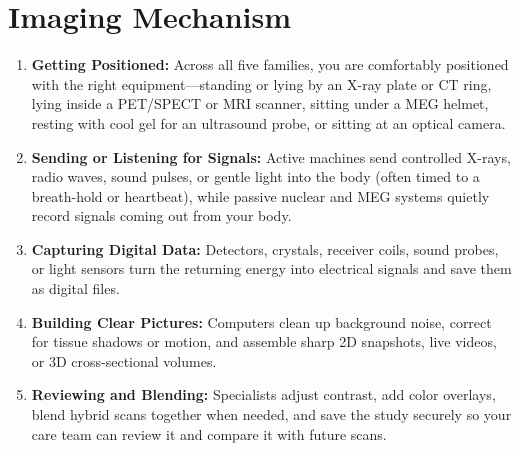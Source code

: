 \section{Imaging Mechanism}
\begin{enumerate}
  \item \textbf{Getting Positioned:} Across all five families, you are comfortably positioned with the right equipment---standing or lying by an X-ray plate or CT ring, lying inside a PET/SPECT or MRI scanner, sitting under a MEG helmet, resting with cool gel for an ultrasound probe, or sitting at an optical camera.
  \item \textbf{Sending or Listening for Signals:} Active machines send controlled X-rays, radio waves, sound pulses, or gentle light into the body (often timed to a breath-hold or heartbeat), while passive nuclear and MEG systems quietly record signals coming out from your body.
  \item \textbf{Capturing Digital Data:} Detectors, crystals, receiver coils, sound probes, or light sensors turn the returning energy into electrical signals and save them as digital files.
  \item \textbf{Building Clear Pictures:} Computers clean up background noise, correct for tissue shadows or motion, and assemble sharp 2D snapshots, live videos, or 3D cross-sectional volumes.
  \item \textbf{Reviewing and Blending:} Specialists adjust contrast, add color overlays, blend hybrid scans together when needed, and save the study securely so your care team can review it and compare it with future scans.
\end{enumerate}


